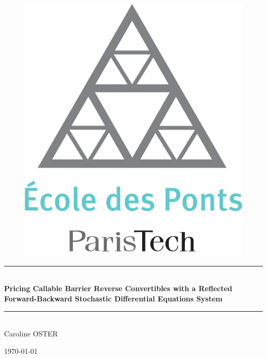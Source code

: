 \documentclass[a4paper,11pt,english]{book}
\begin{document}

\frontmatter
\begin{titlepage}
\begin{center}
\begin{figure}[H] 
    \centering
    \includegraphics[scale=0.2]{images/Logo_ponts_paristech.png} 
    \vspace{4ex}
\end{figure}
\rule{\linewidth}{0.5mm} \\[0.4cm]
{ \LARGE \bfseries Pricing Callable Barrier Reverse Convertibles with a Reflected Forward-Backward Stochastic Differential Equations System \\
}
\rule{\linewidth}{0.5mm} \\[1cm]


Caroline \textsc{OSTER}

\noindent

\vspace{4cm}

{\today}
\end{center}
\end{titlepage}
\newpage
\end{document}
